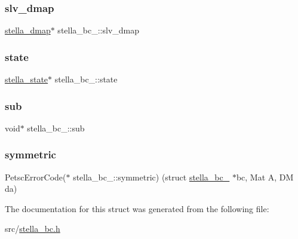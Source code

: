 \mbox{\label{structstella__bc___a453c6b9c2481ed13c7af4a0d335d8d85}} 
\subsubsection{\texorpdfstring{slv\+\_\+dmap}{slv\_dmap}}
{\footnotesize\ttfamily \mbox{\hyperlink{structstella__dmap}{stella\+\_\+dmap}}$\ast$ stella\+\_\+bc\+\_\+\+::slv\+\_\+dmap}

\mbox{\label{structstella__bc___a7953ce53a948c0f3efc9434428841bf4}} 
\subsubsection{\texorpdfstring{state}{state}}
{\footnotesize\ttfamily \mbox{\hyperlink{structstella__state}{stella\+\_\+state}}$\ast$ stella\+\_\+bc\+\_\+\+::state}

\mbox{\label{structstella__bc___a8b1e44390d286055ef05ab8ec3dd48da}} 
\subsubsection{\texorpdfstring{sub}{sub}}
{\footnotesize\ttfamily void$\ast$ stella\+\_\+bc\+\_\+\+::sub}

\mbox{\label{structstella__bc___a52d038c098ef52238c994fb1a04062ee}} 
\subsubsection{\texorpdfstring{symmetric}{symmetric}}
{\footnotesize\ttfamily Petsc\+Error\+Code($\ast$ stella\+\_\+bc\+\_\+\+::symmetric) (struct \mbox{\hyperlink{structstella__bc__}{stella\+\_\+bc\+\_\+}} $\ast$bc, Mat A, DM da)}



The documentation for this struct was generated from the following file\+:\begin{DoxyCompactItemize}
\item 
src/\mbox{\hyperlink{stella__bc_8h}{stella\+\_\+bc.\+h}}\end{DoxyCompactItemize}
